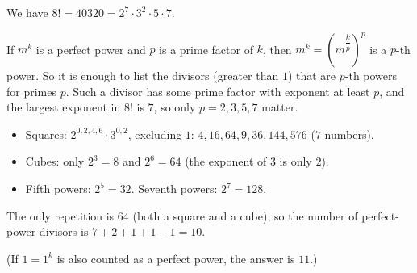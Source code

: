 We have $8!=40320=2^7\cdot3^2\cdot5\cdot7$.

If $m^k$ is a perfect power and $p$ is a prime factor of $k$, then $m^k=\left(m^{\dfrac kp}\right)^p$ is a $p$-th power. So it is enough to list the divisors (greater than $1$) that are $p$-th powers for primes $p$. Such a divisor has some prime factor with exponent at least $p$, and the largest exponent in $8!$ is $7$, so only $p=2,3,5,7$ matter.
\begin{itemize}
\item Squares: $2^{0,2,4,6}\cdot3^{0,2}$, excluding $1$: $4,16,64,9,36,144,576$ ($7$ numbers).
\item Cubes: only $2^3=8$ and $2^6=64$ (the exponent of $3$ is only $2$).
\item Fifth powers: $2^5=32$. Seventh powers: $2^7=128$.
\end{itemize}
The only repetition is $64$ (both a square and a cube), so the number of perfect-power divisors is $7+2+1+1-1=\boxed{10}$.

(If $1=1^k$ is also counted as a perfect power, the answer is $11$.)
